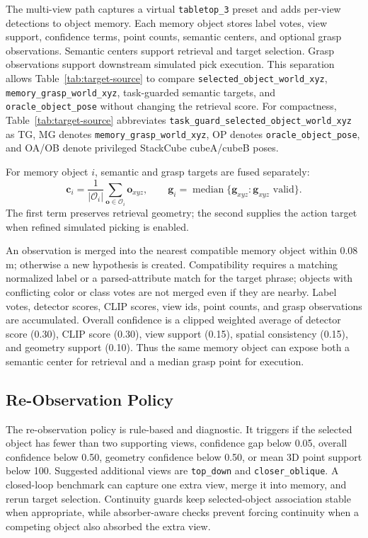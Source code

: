\documentclass[conference]{IEEEtran}
\begin{document}
The multi-view path captures a virtual \texttt{tabletop\_3} preset and adds
per-view detections to object memory. Each memory object stores label votes,
view support, confidence terms, point counts, semantic centers, and optional
grasp observations. Semantic centers support retrieval and target selection.
Grasp observations support downstream simulated pick execution. This separation
allows Table~\ref{tab:target-source} to compare \texttt{selected\_object\_world\_xyz},
\texttt{memory\_grasp\_world\_xyz}, task-guarded semantic targets, and
\texttt{oracle\_object\_pose} without changing the retrieval score.
For compactness, Table~\ref{tab:target-source} abbreviates
\texttt{task\_guard\_selected\_object\_world\_xyz} as TG, MG denotes
\texttt{memory\_grasp\_world\_xyz}, OP denotes
\texttt{oracle\_object\_pose}, and OA/OB denote privileged StackCube cubeA/cubeB
poses.

For memory object $i$, semantic and grasp targets are fused separately:
\begin{equation}
\mathbf{c}_i = \frac{1}{|\mathcal{O}_i|}\sum_{\mathbf{o}\in\mathcal{O}_i}
\mathbf{o}_{xyz}, \qquad
\mathbf{g}_i = \operatorname{median}\{\mathbf{g}_{xyz}:\mathbf{g}_{xyz}
\text{ valid}\}.
\end{equation}
The first term preserves retrieval geometry; the second supplies the action
target when refined simulated picking is enabled.

An observation is merged into the nearest compatible memory object within
0.08 m; otherwise a new hypothesis is created. Compatibility requires a
matching normalized label or a parsed-attribute match for the target phrase;
objects with conflicting color or class votes are not merged even if they are
nearby. Label votes, detector scores, CLIP scores, view ids, point counts, and
grasp observations are accumulated.
Overall confidence is a clipped weighted average of detector score (0.30),
CLIP score (0.30), view support (0.15), spatial consistency (0.15), and
geometry support (0.10). Thus the same memory object can expose both a semantic
center for retrieval and a median grasp point for execution.

\subsection{Re-Observation Policy}

The re-observation policy is rule-based and diagnostic. It triggers if the
selected object has fewer than two supporting views, confidence gap below
0.05, overall confidence below 0.50, geometry confidence below 0.50, or mean
3D point support below 100. Suggested additional views are \texttt{top\_down}
and \texttt{closer\_oblique}. A closed-loop benchmark can capture one extra
view, merge it into memory, and rerun target selection.
Continuity guards keep selected-object association stable when appropriate,
while absorber-aware checks prevent forcing continuity when a competing object
also absorbed the extra view.
\end{document}
